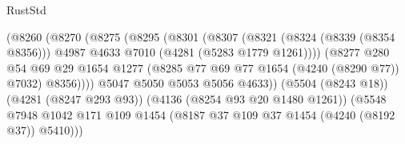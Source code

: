 \begin{lexlean}{RustStd}
\begin{coremodule}
{\begin{coremodule}
{{{{{{{{{{{{{{{{{{{{{{{{{{{{{{{{{{{                                            (@8260
                                              (@8270
                                                (@8275
                                                  (@8295
                                                    (@8301
                                                      (@8307
                                                        (@8321
                                                          (@8324 (@8339 (@8354 @8356)))
                                                          @4987
                                                          @4633
                                                          @7010
                                                          (@4281 (@5283 @1779 @1261))))
                                                      (@8277
                                                        @280
                                                        @54
                                                        @69
                                                        @29
                                                        @1654
                                                        @1277
                                                        (@8285
                                                          @77
                                                          @69
                                                          @77
                                                          @1654
                                                          (@4240 (@8290 @77))
                                                          @7032)
                                                        @8356))))
                                                @5047
                                                @5050
                                                @5053
                                                @5056
                                                @4633))
                                            (@5504 (@8243 @18))
                                            (@4281 (@8247 @293 @93))
                                            (@4136 (@8254 @93 @20 @1480 @1261))
                                            (@5548
                                              @7948
                                              @1042
                                              @171
                                              @109
                                              @1454
                                              (@8187 @37 @109 @37 @1454 (@4240 (@8192 @37)) @5410)))
}}}}}}}}}}}}}}}}}}}}}}}}}}}}}}}}}}}
\end{coremodule}}
\end{coremodule}
\end{lexlean}
